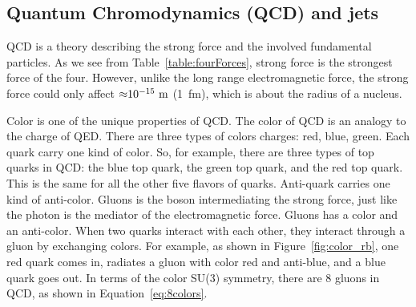  
  




 



\subsection{Quantum Chromodynamics (QCD) and jets}

QCD is a theory describing the strong force and the involved fundamental particles. 
As we see from Table~\ref{table:fourForces}, strong force is the strongest force of the four. 
However, unlike the long range electromagnetic force, 
the strong force could only affect ${\rm {\approx} 10^{-15}~m}$ (1~fm), which is about the radius of 
a nucleus. 

Color is one of the unique properties of QCD. The color of QCD is an analogy to the charge of QED. There are three types of colors charges: red,
blue, green. Each quark carry one kind of color.
So, for example, there are 
three types of top quarks in QCD:  the blue top quark, the green top quark, and the red top quark.
This is the same for all the other five flavors of quarks.  
Anti-quark carries one kind of anti-color. 
Gluons is the boson intermediating the strong force, just like the
photon is the mediator of the electromagnetic force.
Gluons has a color and an anti-color. 
When two quarks interact with each other, 
they interact through a gluon by exchanging colors.
For example, as shown in Figure~\ref{fig:color_rb}, one red quark comes in, radiates a gluon with color red and anti-blue, 
and a blue quark goes out. In terms of the color SU(3) symmetry, there are 8 gluons in QCD, as
shown in Equation~\ref{eq:8colors}.

